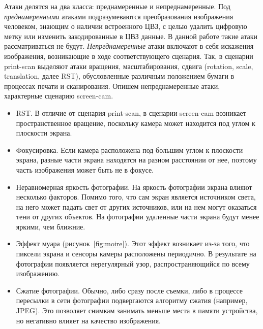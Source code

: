 \documentclass[12pt,a4paper]{article}
\begin{document}
Атаки делятся на два класса: преднамеренные и непреднамеренные.
Под \textit{преднамеренными} атаками подразумеваются преобразования изображения человеком, знающим о наличии встроенного ЦВЗ, с целью удалить цифровую метку или изменить закодированные в ЦВЗ данные.
В данной работе такие атаки рассматриваться не будут.
\textit{Непреднамеренные} атаки включают в себя искажения изображения, возникающие в ходе соответствующего сценария.
Так, в сценарии print-scan выделяют атаки вращения, масштабирования, сдвига (rotation, scale, translation, далее RST), обусловленные различным положением бумаги в процессах печати и сканирования.
Опишем непреднамеренные атаки, характерные сценарию screen-cam.
\begin{itemize}
\item
RST.
В отличие от сценария print-scan, в сценарии screen-cam возникает пространственное вращение, поскольку камера может находится под углом к плоскости  экрана.
\item
Фокусировка.
Если камера расположена под большим углом к плоскости экрана, разные части экрана находятся на разном расстоянии от нее, поэтому часть изображения может быть не в фокусе.
\item
Неравномерная яркость фотографии.
На яркость фотографии экрана влияют несколько факторов.
Помимо того, что сам экран является источником света, на него может падать свет от других источников, или  на нем могут оказаться тени от других объектов.
На фотографии удаленные части экрана будут менее яркими, чем ближние.
\item
Эффект муара (рисунок~\ref{fig:moire}).
Этот эффект возникает из-за того, что пиксели экрана и сенсоры камеры расположены периодично.
В результате на фотографии появляется нерегулярный узор, распространяющийся по всему изображению.
\item
Сжатие фотографии.
Обычно, либо сразу после съемки, либо в процессе пересылки в сети фотографии подвергаются алгоритму сжатия (например, JPEG).
Это позволяет снимкам занимать меньше места в памяти устройства, но негативно влияет на качество изображения.
\end{itemize}
\end{document}

